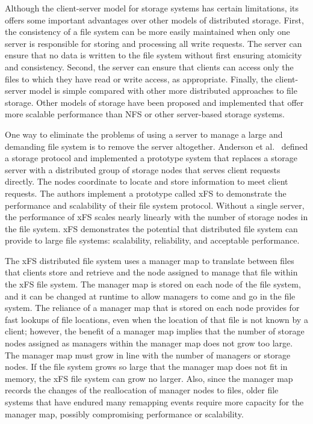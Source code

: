 Although the client-server model for storage systems has certain limitations, its offers some important advantages over other models of distributed storage.  First, the consistency of a file system can be more easily maintained when only one server is responsible for storing and processing all write requests.  The server can ensure that no data is written to the file system without first ensuring atomicity and consistency.  Second, the server can ensure that clients can access only the files to which they have read or write access, as appropriate.  Finally, the client-server model is simple compared with other more distributed approaches to file storage.  Other models of storage have been proposed and implemented that offer more scalable performance than NFS or other server-based storage systems.

One way to eliminate the problems of using a server to manage a large and demanding file system is to remove the server altogether.  Anderson et al.~\cite{ref1} defined a storage protocol and implemented a prototype system that replaces a storage server with a distributed group of storage nodes that serves client requests directly.  The nodes coordinate to locate and store information to meet client requests.  The authors implement a prototype called xFS to demonstrate the performance and scalability of their file system protocol.  Without a single server, the performance of xFS scales nearly linearly with the number of storage nodes in the file system.  xFS demonstrates the potential that distributed file system can provide to large file systems: scalability, reliability, and acceptable performance.

The xFS distributed file system uses a manager map to translate between files that clients store and retrieve and the node assigned to manage that file within the xFS file system.  The manager map is stored on each node of the file system, and it can be changed at runtime to allow managers to come and go in the file system.  The reliance of a manager map that is stored on each node provides for fast lookups of file locations, even when the location of that file is not known by a client; however, the benefit of a manager map implies that the number of storage nodes assigned as managers within the manager map does not grow too large.  The manager map must grow in line with the number of managers or storage nodes.  If the file system grows so large that the manager map does not fit in memory, the xFS file system can grow no larger.  Also, since the manager map records the changes of the reallocation of manager nodes to files, older file systems that have endured many remapping events require more capacity for the manager map, possibly compromising performance or scalability.

